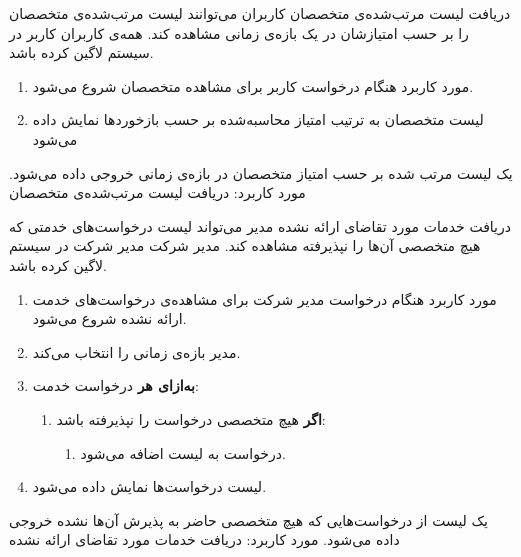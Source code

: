 {
\usecase
{دریافت لیست مرتب‌شده‌ی متخصصان}
{}
{کاربران می‌توانند لیست مرتب‌شده‌ی متخصصان را بر حسب امتیازشان در یک بازه‌ی زمانی مشاهده کند.}
{همه‌ی کاربران}
{}
{کاربر در سیستم لاگین کرده باشد.}
{
	\vspace*{-0.6cm}
	\begin{enumerate}
		\item 
		مورد کاربرد هنگام درخواست کاربر برای مشاهده متخصصان  شروع می‌شود.
		\item
لیست متخصصان به ترتیب امتیاز محاسبه‌شده بر حسب بازخوردها نمایش داده می‌شود	
		\end{enumerate}

}
{یک لیست مرتب شده بر حسب امتیاز متخصصان در بازه‌ی زمانی خروجی داده می‌شود.}
{
}
{
		مورد کاربرد: دریافت لیست مرتب‌شده‌ی متخصصان
}

}

{
\usecase
{دریافت خدمات مورد تقاضای ارائه نشده}
{}
{مدیر می‌تواند لیست درخواست‌های خدمتی که هیچ متخصصی آن‌ها را نپذیرفته مشاهده کند.}
{مدیر شرکت}
{}
{مدیر شرکت در سیستم لاگین کرده باشد.}
{
	\vspace*{-0.6cm}
	\begin{enumerate}
		\item 
		مورد کاربرد هنگام درخواست مدیر شرکت برای مشاهده‌ی درخواست‌های خدمت ارائه نشده شروع می‌شود.
		\item
		مدیر بازه‌ی زمانی را انتخاب می‌کند.
		\item
		\textbf{به‌ازای هر} درخواست خدمت:
		\begin{enumerate}[label=\theenumi.\arabic*.]
			\item 
			\textbf{اگر} هیچ متخصصی درخواست را نپذیرفته باشد:
			\begin{enumerate}
				\item 
				درخواست به لیست اضافه می‌شود.
			\end{enumerate}
		\end{enumerate}
		\item
		لیست درخواست‌ها نمایش داده می‌شود.
	\end{enumerate}
}
{یک لیست از درخواست‌هایی که هیچ متخصصی حاضر به پذیرش آن‌ها نشده خروجی داده می‌شود.}
{
}
{
مورد کاربرد:	دریافت خدمات مورد تقاضای ارائه نشده
}
}

